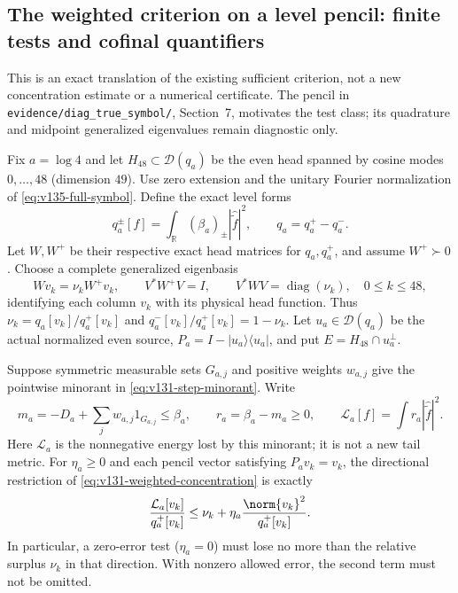 \subsection*{The weighted criterion on a level pencil: finite tests and cofinal quantifiers}

This is an exact translation of the existing sufficient criterion, not a
new concentration estimate or a numerical certificate. The pencil in
\texttt{evidence/diag\_true\_symbol/}, Section~7, motivates the test class;
its quadrature and midpoint generalized eigenvalues remain diagnostic only.

\begin{proposition}
\label{prop:v144-pencil-concentration}
Fix $a=\log4$ and let $H_{48}\subset\mathcal D(q_a)$ be the even
head spanned by cosine modes $0,\ldots,48$ (dimension $49$).
Use zero extension and the unitary Fourier normalization of
\eqref{eq:v135-full-symbol}. Define the exact level forms
\[
 q_a^\pm[f]=\int_{\mathbb R}(\beta_a)_\pm
                    |\widehat{\widetilde f}|^2,
 \qquad q_a=q_a^+-q_a^-.
\]
Let $W,W^+$ be their respective exact head matrices for $q_a,q_a^+$,
and assume $W^+\succ0$. Choose a complete generalized eigenbasis
\[
 Wv_k=\nu_k W^+v_k,\qquad
 V^*W^+V=I,\qquad V^*WV=\operatorname{diag}(\nu_k),
 \quad 0\le k\le48,
\]
identifying each column $v_k$ with its physical head function.
Thus $\nu_k=q_a[v_k]/q_a^+[v_k]$ and
$q_a^-[v_k]/q_a^+[v_k]=1-\nu_k$.
Let $u_a\in\mathcal D(q_a)$ be the actual normalized even source,
$P_a=I-|u_a\rangle\langle u_a|$, and put
$E=H_{48}\cap u_a^\perp$.

Suppose symmetric measurable sets $G_{a,j}$ and positive weights $w_{a,j}$
give the pointwise minorant in \eqref{eq:v131-step-minorant}. Write
\[
 m_a=-D_a+\sum_jw_{a,j}1_{G_{a,j}}\le\beta_a,\qquad
 r_a=\beta_a-m_a\ge0,\qquad
 \mathcal L_a[f]=\int r_a|\widehat{\widetilde f}|^2.
\]
Here $\mathcal L_a$ is the nonnegative energy lost by this minorant;
it is not a new tail metric. For $\eta_a\ge0$ and each pencil
vector satisfying $P_av_k=v_k$, the directional restriction of
\eqref{eq:v131-weighted-concentration} is exactly
\begin{equation}\label{eq:v144-direction-budget}
 \frac{\mathcal L_a[v_k]}{q_a^+[v_k]}
 \le\nu_k+\eta_a\frac{\norm{v_k}^2}{q_a^+[v_k]}.
\end{equation}
In particular, a zero-error test ($\eta_a=0$) must lose no more
than the relative surplus $\nu_k$ in that direction. With nonzero
allowed error, the second term must not be omitted.


\end{proposition}
